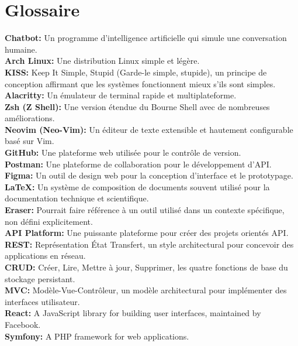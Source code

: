\chapter{Glossaire}
\label{chap:Glossary} 


\hspace{16pt}\textbf{Chatbot: }Un programme d'intelligence artificielle qui simule une conversation humaine.\\

\textbf{Arch Linux: }Une distribution Linux simple et légère.\\

\textbf{KISS: }Keep It Simple, Stupid (Garde-le simple, stupide), un principe de conception affirmant que les systèmes fonctionnent mieux s'ils sont simples.\\

\textbf{Alacritty: }Un émulateur de terminal rapide et multiplateforme.\\

\textbf{Zsh (Z Shell): }Une version étendue du Bourne Shell avec de nombreuses améliorations.\\

\textbf{Neovim (Neo-Vim): }Un éditeur de texte extensible et hautement configurable basé sur Vim.\\

\textbf{GitHub: }Une plateforme web utilisée pour le contrôle de version.\\

\textbf{Postman: }Une plateforme de collaboration pour le développement d'API.\\

\textbf{Figma: }Un outil de design web pour la conception d'interface et le prototypage.\\

\textbf{\LaTeX: }Un système de composition de documents souvent utilisé pour la documentation technique et scientifique.\\

\textbf{Eraser: }Pourrait faire référence à un outil utilisé dans un contexte spécifique, non défini explicitement.\\

\textbf{API Platform: }Une puissante plateforme pour créer des projets orientés API.\\

\textbf{REST: }Représentation État Transfert, un style architectural pour concevoir des applications en réseau.\\

\textbf{CRUD: }Créer, Lire, Mettre à jour, Supprimer, les quatre fonctions de base du stockage persistant.\\

\textbf{MVC: }Modèle-Vue-Contrôleur, un modèle architectural pour implémenter des interfaces utilisateur.\\

\textbf{React: }A JavaScript library for building user interfaces, maintained by Facebook.\\

\textbf{Symfony: }A PHP framework for web applications.\\

\pagebreak
